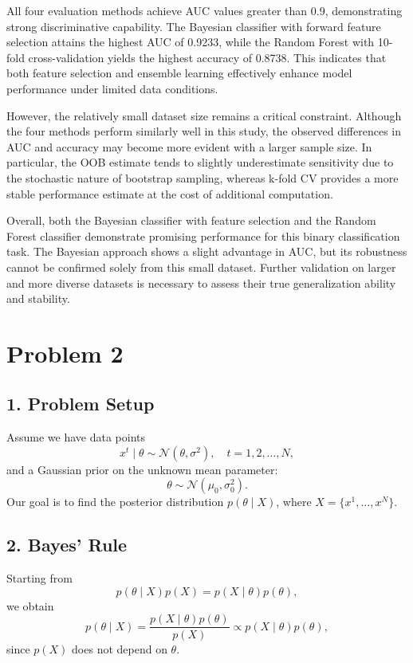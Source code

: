 \documentclass[12pt,a4paper]{article}
\begin{document}
All four evaluation methods achieve AUC values greater than 0.9, demonstrating strong discriminative capability. The Bayesian classifier with forward feature selection attains the highest AUC of 0.9233, while the Random Forest with 10-fold cross-validation yields the highest accuracy of 0.8738. This indicates that both feature selection and ensemble learning effectively enhance model performance under limited data conditions.

However, the relatively small dataset size remains a critical constraint. Although the four methods perform similarly well in this study, the observed differences in AUC and accuracy may become more evident with a larger sample size. In particular, the OOB estimate tends to slightly underestimate sensitivity due to the stochastic nature of bootstrap sampling, whereas k-fold CV provides a more stable performance estimate at the cost of additional computation.

Overall, both the Bayesian classifier with feature selection and the Random Forest classifier demonstrate promising performance for this binary classification task. The Bayesian approach shows a slight advantage in AUC, but its robustness cannot be confirmed solely from this small dataset. Further validation on larger and more diverse datasets is necessary to assess their true generalization ability and stability.

\newpage
\section{Problem 2}

\subsection*{1. Problem Setup}

Assume we have data points 
\[
x^t \mid \theta \sim \mathcal{N}(\theta, \sigma^2), \quad t = 1, 2, \ldots, N,
\]
and a Gaussian prior on the unknown mean parameter:
\[
\theta \sim \mathcal{N}(\mu_0, \sigma_0^2).
\]
Our goal is to find the posterior distribution \( p(\theta \mid X) \), where \( X = \{x^1, \ldots, x^N\} \).



\subsection*{2. Bayes' Rule}

Starting from
\[
p(\theta \mid X)p(X) = p(X \mid \theta)p(\theta),
\]
we obtain
\[
p(\theta \mid X) = \frac{p(X \mid \theta)p(\theta)}{p(X)} \propto p(X \mid \theta)p(\theta),
\]
since \( p(X) \) does not depend on \( \theta \).
\end{document}
